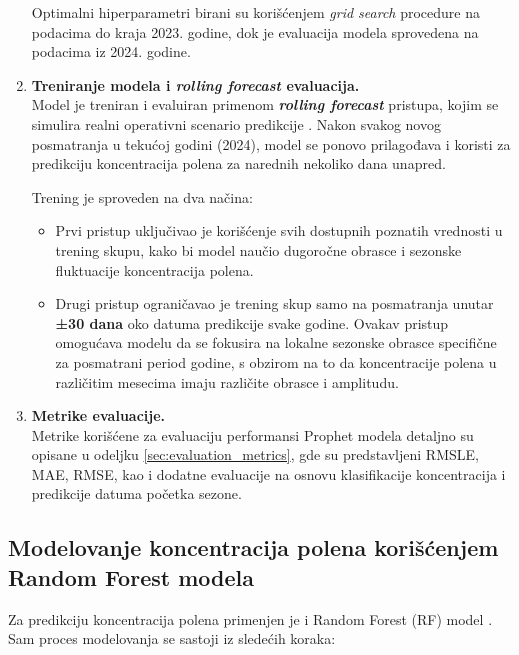 \documentclass[12pt]{article}
\begin{document}
\begin{enumerate}
    Optimalni hiperparametri birani su korišćenjem \textit{grid search} procedure na podacima do kraja 2023. godine, dok je evaluacija modela sprovedena na podacima iz 2024. godine.



    \item \textbf{Treniranje modela i \textit{rolling forecast} evaluacija.} \\
    Model je treniran i evaluiran primenom \textbf{\textit{rolling forecast}} pristupa, kojim se simulira realni operativni scenario predikcije \cite{bergmeir2012use}. Nakon svakog novog posmatranja u tekućoj godini (2024), model se ponovo prilagođava i koristi za predikciju koncentracija polena za narednih nekoliko dana unapred.

    Trening je sproveden na dva načina:
    \begin{itemize}
        \item Prvi pristup uključivao je korišćenje svih dostupnih poznatih vrednosti u trening skupu, kako bi model naučio dugoročne obrasce i sezonske fluktuacije koncentracija polena.
        \item Drugi pristup ograničavao je trening skup samo na posmatranja unutar \textbf{±30 dana} oko datuma predikcije svake godine. Ovakav pristup omogućava modelu da se fokusira na lokalne sezonske obrasce specifične za posmatrani period godine, s obzirom na to da koncentracije polena u različitim mesecima imaju različite obrasce i amplitudu.
    \end{itemize}

    \item \textbf{Metrike evaluacije.} \\
    Metrike korišćene za evaluaciju performansi Prophet modela detaljno su opisane u odeljku \ref{sec:evaluation_metrics}, gde su predstavljeni RMSLE, MAE, RMSE, kao i dodatne evaluacije na osnovu klasifikacije koncentracija i predikcije datuma početka sezone.

\end{enumerate}

\subsection{Modelovanje koncentracija polena korišćenjem Random Forest modela}

Za predikciju koncentracija polena primenjen je i Random Forest (RF) model \cite{breiman2001}.
Sam proces modelovanja se sastoji iz sledećih koraka:
\end{document}
